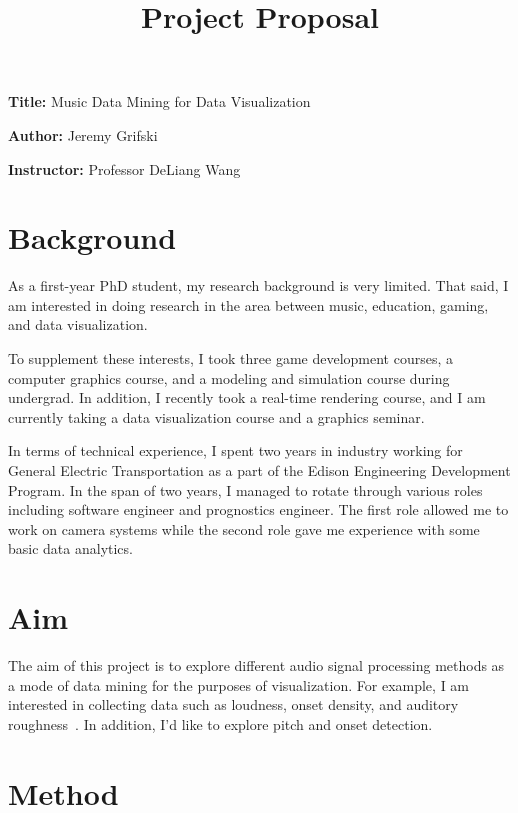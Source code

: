 \documentclass[12pt, a4paper]{article}
\title{Project Proposal}
\author{}
\date{}
\newcommand{\namelistlabel}[1]{\mbox{#1}\hfil}
\newenvironment{namelist}[1]{%
\begin{list}{}
    {
        \let\makelabel\namelistlabel
        \settowidth{\labelwidth}{#1}
        \setlength{\leftmargin}{1.1\labelwidth}
    }
  }{%
\end{list}}
\begin{document}
\maketitle

\begin{namelist}{xxxxxxxxxxxx}
\item[{\bf Title:}]
	Music Data Mining for Data Visualization
\item[{\bf Author:}]
	Jeremy Grifski
\item[{\bf Instructor:}]
	Professor DeLiang Wang
\end{namelist}

\section*{Background}

As a first-year PhD student, my research background is very limited. That said,
I am interested in doing research in the area between music, education, gaming,
and data visualization.

To supplement these interests, I took three game development courses, a
computer graphics course, and a modeling and simulation course during undergrad.
In addition, I recently took a real-time rendering course, and I am
currently taking a data visualization course and a graphics seminar.

In terms of technical experience, I spent two years in industry working for
General Electric Transportation as a part of the Edison Engineering Development
Program. In the span of two years, I managed to rotate through various roles
including software engineer and prognostics engineer. The first role allowed
me to work on camera systems while the second role gave me experience with
some basic data analytics.

\section*{Aim}

The aim of this project is to explore different audio signal processing methods
as a mode of data mining for the purposes of visualization. For example, I am
interested in collecting data such as loudness, onset density, and auditory
roughness~\cite{knuth}. In addition, I'd like to explore pitch and onset
detection.

\section*{Method}
\end{document}
